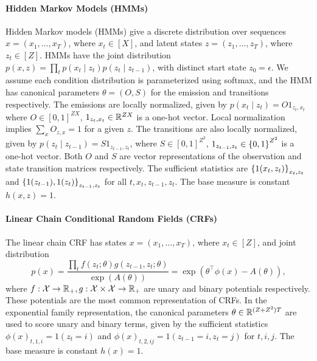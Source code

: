 \documentclass[11pt]{article}
\begin{document}
\paragraph{Hidden Markov Models (HMMs)}
Hidden Markov models (HMMs) give a discrete distribution over sequences $x = (x_1,\ldots,x_T)$,
where $x_t\in[X]$,
and latent states $z = (z_1,\ldots,z_T)$, where $z_t\in[Z]$.
HMMs have the joint distribution
$p(x,z) = \prod_t p(x_t\mid z_t)p(z_t\mid z_{t-1})$,
with distinct start state $z_0=\epsilon$.
We assume each condition distribution is parameterized using softmax,
and the HMM has canonical parameters $\theta = (O,S)$ for the emission and transitions respectively.
The emissions are locally normalized, given by $p(x_t\mid z_t) = O 1_{z_t,x_t}$
where $O\in[0,1]^{ZX}$, $1_{z_t,x_t}\in\mathbb{R}^{ZX}$ is a one-hot vector.
Local normalization implies $\sum_x O_{z,x}=1$ for a given $z$.
The transitions are also locally normalized, given by $p(z_t\mid z_{t-1}) = S 1_{z_{t-1},z_t}$,
where $S\in[0,1]^{Z^2}$, $1_{z_{t-1},z_t}\in\left\{0,1\right\}^{Z^2}$ is a one-hot vector.
Both $O$ and $S$ are vector representations of the observation and state transition
matrices respectively.
The sufficient statistics are $\left\{1(x_t,z_t)\right\}_{x_t,z_t}$
and $\left\{1(z_{t-1}),1(z_t)\right\}_{z_{t-1},z_t}$ for all $t,x_t,z_{t-1},z_t$.
The base measure is constant $h(x,z) = 1$.

\paragraph{Linear Chain Conditional Random Fields (CRFs)}
The linear chain CRF has states $x = (x_1,\ldots,x_T)$, where $x_t\in[Z]$,
and joint distribution
$$p(x) = \frac{\prod_t f(z_t; \theta)g(z_{t-1},z_t; \theta)}{\exp(A(\theta))}
= \exp(\theta^\top \phi(x) - A(\theta)),$$
where $f:\mathcal{X}\to\mathbb{R}_+,g:\mathcal{X}\times\mathcal{X}\to\mathbb{R}_+$ are unary and binary potentials respectively.
These potentials are the most common representation of CRFs.
In the exponential family representation,
the canonical parameters $\theta\in\mathbb{R}^{(Z + Z^2)T}$ are used to score unary and binary terms,
given by the sufficient statistics $\phi(x)_{t,1,i} = 1(z_t = i)$ and
$\phi(x)_{t,2,ij} = 1(z_{t-1} = i, z_t = j)$ for $t,i,j$.
The base measure is constant $h(x) = 1$.
\end{document}

